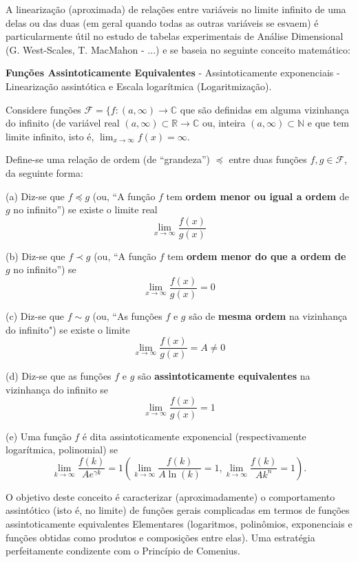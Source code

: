    A linearização (aproximada) de relações entre variáveis no limite infinito de uma delas ou das duas (em geral quando todas as outras variáveis se esvaem) é particularmente útil no estudo de tabelas experimentais de Análise Dimensional (G. West-Scales, T. MacMahon - ...) e se baseia no seguinte conceito matemático:
    
    \textbf{Funções Assintoticamente Equivalentes} - Assintoticamente exponenciais - Linearização assintótica e Escala logarítmica (Logaritmização).

    Considere funções \(\mathcal{F} = \{f: (a, \infty) \to \mathbb{C}\) que são definidas em alguma vizinhança do infinito (de variável real \((a, \infty) \subset \mathbb{R} \to \mathbb{C}\) ou, inteira \((a, \infty) \subset \mathbb{N}\) e que tem limite infinito, isto é, \(\displaystyle\lim_{x \to \infty} f(x) = \infty\).

    Define-se uma relação de ordem (de ``grandeza'') \(\preceq\) entre duas funções \(f, g \in \mathcal{F}\), da seguinte forma:

\begin{definition}
(a) Diz-se que \(f \preceq g\) (ou, ``A função \(f\) tem \textbf{ordem menor ou igual a ordem} de \(g\) no infinito'') se existe o limite real
\[\displaystyle\lim_{x \to \infty} \dfrac{f(x)}{g(x)}\]

(b) Diz-se que \(f \prec g\) (ou, ``A função \(f\) tem \textbf{ordem menor do que a ordem de} \(g\) no infinito'') se
\[\displaystyle\lim_{x \to \infty} \dfrac{f(x)}{g(x)} = 0\]

(c) Diz-se que \(f \sim g\) (ou, ``As funções \(f\) e \(g\) são de \textbf{mesma ordem} na vizinhança do infinito") se existe o limite
\[\displaystyle\lim_{x \to \infty} \dfrac{f(x)}{g(x)} = A \neq 0\]

(d) Diz-se que as funções \(f\) e \(g\) são \textbf{assintoticamente equivalentes} na vizinhança do infinito se
\[\displaystyle\lim_{x \to \infty} \dfrac{f(x)}{g(x)} = 1\]

(e) Uma função \(f\) é dita assintoticamente exponencial (respectivamente logarítmica, polinomial) se
\[\displaystyle\lim_{k \to \infty} \dfrac{f(k)}{Ae^{\gamma k}} = 1 \left(\lim_{k \to \infty} \dfrac{f(k)}{A\ln(k)} = 1, \lim_{k \to \infty} \dfrac{f(k)}{Ak^{n}} = 1\right).\]
\end{definition}

\begin{remark}
    O objetivo deste conceito é caracterizar (aproximadamente) o comportamento assintótico (isto é, no limite) de funções gerais complicadas em termos de funções assintoticamente equivalentes Elementares (logaritmos, polinômios, exponenciais e funções obtidas como produtos e composições entre elas). Uma estratégia perfeitamente condizente com o Princípio de Comenius.
\end{remark}

